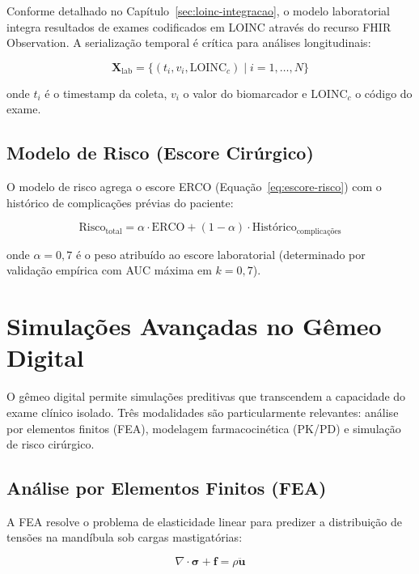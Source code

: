 Conforme detalhado no Capítulo~\ref{sec:loinc-integracao}, o modelo laboratorial integra resultados de exames codificados em LOINC através do recurso FHIR Observation. A serialização temporal é crítica para análises longitudinais:

\begin{equation}
\label{eq:serie-temporal}
\mathbf{X}_{\text{lab}} = \{(t_i, v_i, \text{LOINC}_c) \mid i=1,\dots,N\}
\end{equation}

onde $t_i$ é o timestamp da coleta, $v_i$ o valor do biomarcador e $\text{LOINC}_c$ o código do exame.

\subsection{Modelo de Risco (Escore Cirúrgico)}
\label{subsec:modelo-risco}

O modelo de risco agrega o escore ERCO (Equação~\ref{eq:escore-risco}) com o histórico de complicações prévias do paciente:

\begin{equation}
\label{eq:risco-composicional}
\text{Risco}_{\text{total}} = \alpha \cdot \text{ERCO} + (1-\alpha) \cdot \text{Histórico}_{\text{complicações}}
\end{equation}

onde $\alpha = 0,7$ é o peso atribuído ao escore laboratorial (determinado por validação empírica com AUC máxima em $k=0,7$).

\section{Simulações Avançadas no Gêmeo Digital}
\label{sec:simulacoes}

O gêmeo digital permite simulações preditivas que transcendem a capacidade do exame clínico isolado. Três modalidades são particularmente relevantes: análise por elementos finitos (FEA), modelagem farmacocinética (PK/PD) e simulação de risco cirúrgico.

\subsection{Análise por Elementos Finitos (FEA)}
\label{subsec:fea}

A FEA resolve o problema de elasticidade linear para predizer a distribuição de tensões na mandíbula sob cargas mastigatórias:

\begin{equation}
\label{eq:elasticidade}
\nabla \cdot \boldsymbol{\sigma} + \mathbf{f} = \rho \ddot{\mathbf{u}}
\end{equation}

